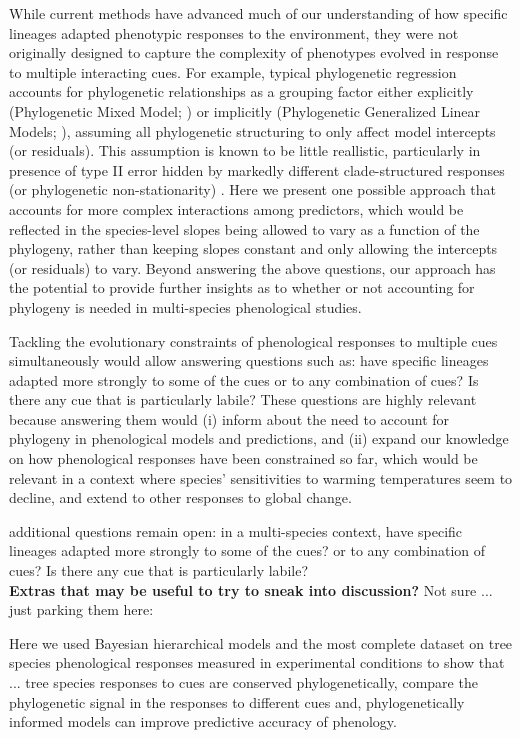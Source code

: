 \documentclass{article}\usepackage[]{graphicx}\usepackage[]{color}
\begin{document}
While current methods have advanced much of our understanding of how specific lineages adapted phenotypic responses to the environment, they were not originally designed to capture the complexity of phenotypes evolved in response to multiple interacting cues. For example, typical phylogenetic regression accounts for phylogenetic relationships as a grouping factor either explicitly (Phylogenetic Mixed Model; \cite{housworth2004phylogenetic}) or implicitly (Phylogenetic Generalized Linear Models; \cite{revell2010phylogenetic}), assuming all phylogenetic structuring to only affect model intercepts (or residuals). This assumption is known to be little reallistic, particularly in presence of type II error hidden by markedly different clade-structured responses (or phylogenetic non-stationarity) \citep{davies2019phylogenetically}. Here we present one possible approach that accounts for more complex interactions among predictors, which would be reflected in the species-level slopes being allowed to vary as a function of the phylogeny, rather than keeping slopes constant and only allowing the intercepts (or residuals) to vary. Beyond answering the above questions, our approach has the potential to provide further insights as to whether or not accounting for phylogeny is needed in multi-species phenological studies.

Tackling the evolutionary constraints of phenological responses to multiple cues simultaneously would allow answering questions such as: have specific lineages adapted more strongly to some of the cues or to any combination of cues? Is there any cue that is particularly labile? These questions are highly relevant because answering them would (i) inform about the need to account for phylogeny in phenological models and predictions, and (ii) expand our knowledge on how phenological responses have been constrained so far, which would be relevant in a context where species' sensitivities to warming temperatures seem to decline, and extend to other responses to global change.

additional questions remain open: in a multi-species context, have specific lineages adapted more strongly to some of the cues? or to any combination of cues? Is there any cue that is particularly labile?\\


{\bf Extras that may be useful to try to sneak into discussion?} Not sure ... just parking them here:

Here we used Bayesian hierarchical models and the most complete dataset on tree species phenological responses measured in experimental conditions to show that ...  tree species responses to cues are conserved phylogenetically, compare the phylogenetic signal in the responses to different cues and, phylogenetically informed models can improve predictive accuracy of phenology.
\end{document}
